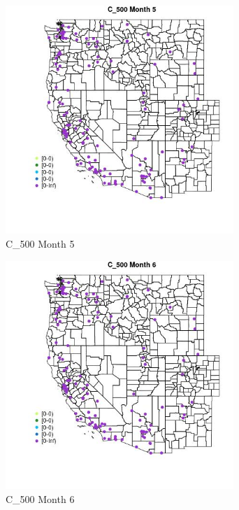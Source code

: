 \begin{figure} 
\centering  
\includegraphics[width=0.77\textwidth]{Code_Outputs/Report_ML_input_PM25_Step4_part_e_de_duplicated_aves_MapObsMo5C_500.jpg} 
\caption{\label{fig:Report_ML_input_PM25_Step4_part_e_de_duplicated_avesMapObsMo5C_500}C_500 Month 5} 
\end{figure} 
 

\begin{figure} 
\centering  
\includegraphics[width=0.77\textwidth]{Code_Outputs/Report_ML_input_PM25_Step4_part_e_de_duplicated_aves_MapObsMo6C_500.jpg} 
\caption{\label{fig:Report_ML_input_PM25_Step4_part_e_de_duplicated_avesMapObsMo6C_500}C_500 Month 6} 
\end{figure} 
 


